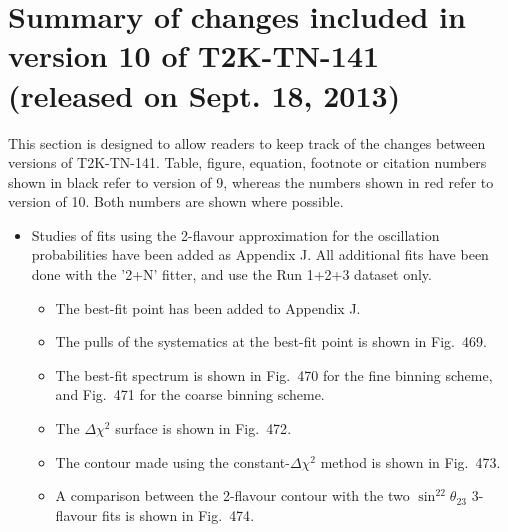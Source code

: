 
\section{Summary of changes included in version 10 of T2K-TN-141 (released on Sept. 18, 2013)}

This section is designed to allow readers to keep track of the changes between versions of T2K-TN-141.
Table, figure, equation, footnote or citation numbers shown in black refer to version of 9,
{\color{red}whereas the numbers shown in red refer to version of 10}.
Both numbers are shown where possible.

\begin{itemize}

\item
  Studies of fits using the 2-flavour approximation for the oscillation probabilities
  have been added as Appendix {\color{red}J}.
  All additional fits have been done with the
  '2+N' fitter, and use the Run 1+2+3 dataset only.
  \begin{itemize}
  \item The best-fit point has been added to Appendix {\color{red}J}.
  \item The pulls of the systematics at the best-fit point is shown in Fig.\ {\color{red}469}.
  \item The best-fit spectrum is shown in Fig.\ {\color{red}470} for the fine binning scheme, and
    Fig.\ {\color{red}471} for the coarse binning scheme.
  \item The $\Delta \chi^2$ surface is shown in Fig.\ {\color{red}472}.
  \item The contour made using the constant-$\Delta \chi^2$ method is shown in Fig.\ {\color{red}473}.
  \item A comparison between the 2-flavour contour with the two $\sin^22\theta_{23}$ 3-flavour fits
    is shown in Fig.\ {\color{red}474}.
  \end{itemize}


\end{itemize}
